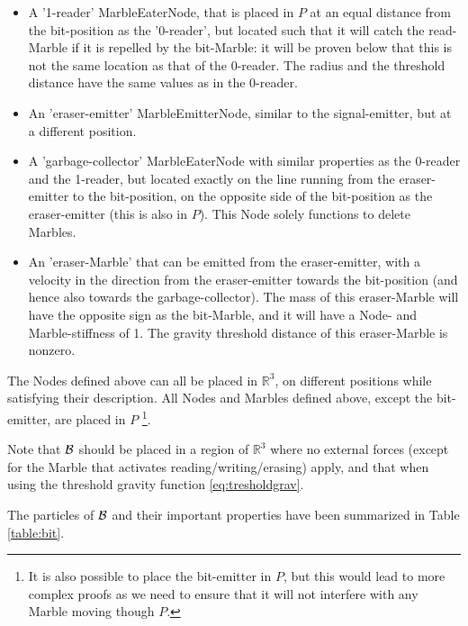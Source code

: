\begin{itemize}
    \item A '1-reader' MarbleEaterNode, that is placed in $P$ at an equal distance from the bit-position as the '0-reader', but located such that it will catch the read-Marble if it is repelled by the bit-Marble: it will be proven below that this is not the same location as that of the 0-reader. The radius and the threshold distance have the same values as in the 0-reader.
    \item An 'eraser-emitter' MarbleEmitterNode, similar to the signal-emitter, but at a different position. 
    \item A 'garbage-collector' MarbleEaterNode with similar properties as the 0-reader and the 1-reader, but located exactly on the line running from the eraser-emitter to the bit-position, on the opposite side of the bit-position as the eraser-emitter (this is also in $P$). This Node solely functions to delete Marbles.
    \item An 'eraser-Marble' that can be emitted from the eraser-emitter, with a velocity in the direction from the eraser-emitter towards the bit-position (and hence also towards the garbage-collector). The mass of this eraser-Marble will have the opposite sign as the bit-Marble, and it will have a Node- and Marble-stiffness of 1. The gravity threshold distance of this eraser-Marble is nonzero.
\end{itemize}

The Nodes defined above can all be placed in $\mathbb{R}^3$, on different positions while satisfying their description. All Nodes and Marbles defined above, except the bit-emitter, are placed in $P$ \footnote{It is also possible to place the bit-emitter in $P$, but this would lead to more complex proofs as we need to ensure that it will not interfere with any Marble moving though $P$.}. 

Note that $\mathcal{B}$ should be placed in a region of $\mathbb{R}^3$ where no external forces (except for the Marble that activates reading/writing/erasing) apply, and that when using the threshold gravity function \ref{eq:tresholdgrav}.

The particles of $\mathcal{B}$ and their important properties have been summarized in Table \ref{table:bit}.

